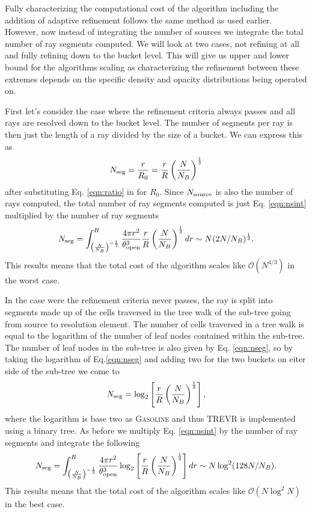 \documentclass[fleq,usenatbib]{mnras}
\newcommand{\acro}{TREVR}
\newcommand{\bigO}[1]{\mathcal{O}\left(#1\right)}
\newcommand{\NS}{N_{\rm source}}
\newcommand{\tO}{\theta_{\rm open}}
\begin{document}
Fully characterizing the computational cost of the algorithm including the 
addition of adaptive refinement follows the same method as used earlier. 
However, now instead of integrating the number of sources we integrate the 
total number of ray segments computed. We will look at two cases, not refining 
at all and fully refining down to the bucket level. This will give us upper 
and lower bound for the algorithms scaling as characterizing the refinement 
between these extremes depends on the specific density and opacity 
distributions being operated on.

First let's consider the case where the refinement criteria always passes and 
all rays are resolved down to the bucket level. The number of segments per ray 
is then just the length of a ray divided by the size of a bucket. We can 
express this as
\begin{equation}
\label{eqn:nseg}
N_{\rm seg} = \frac{r}{R_0} = \frac{r}{R}\left(\frac{N}{N_B}\right)^\frac{1}{3}
\end{equation}
after substituting Eq. \ref{eqn:ratio} in for $R_0$. Since $\NS$ is also the 
number of rays computed, the total number of ray segments computed is just Eq. 
\ref{eqn:nsint} multiplied by the number of ray segments
\begin{equation}
\label{eqn:nsegint}
N_{\rm seg} = \int_{\left(\frac{N}{N_B}\right)^{-\frac{1}{3}}}^R 
\frac{4\pi r^2}{\tO^3}
\frac{r}{R}\left(\frac{N}{N_B}\right)^\frac{1}{3} dr
\sim N(2N/N_B)^\frac{1}{3}.
\end{equation}
This results means that the total cost of the algorithm scales like 
$\bigO{N^{4/3}}$ in the worst case.

In the case were the refinement criteria never passes, the ray is split into 
segments made up of the cells traversed in the tree walk of the sub-tree going 
from source to resolution element. The number of cells traversed in a tree walk
is equal to the logarithm of the number of leaf nodes contained within the 
sub-tree. The number of leaf nodes in the sub-tree is also given by Eq. 
\ref{eqn:nseg}, so by taking the logarithm of Eq.\ref{eqn:nseg} and adding two 
for the two buckets on eiter side of the sub-tree we come to
\begin{equation}
\label{eqn:nseg2}
N_{\rm seg} = \log_2\left[\frac{r}{R}\left(
\frac{N}{N_B}\right)^\frac{1}{3}\right],
\end{equation}
where the logarithm is base two as \textsc{Gasoline} and thus \acro{} is 
implemented using a binary tree. As before we multiply Eq. \ref{eqn:nsint} 
by the number of ray segments and integrate the following
\begin{equation}
\label{eqn:nsegint2}
N_{\rm seg} = \int_{\left(\frac{N}{N_B}\right)^{-\frac{1}{3}}}^R 
\frac{4\pi r^2}{\tO^3}
\log_2\left[\frac{r}{R}\left(
\frac{N}{N_B}\right)^\frac{1}{3}\right] dr
\sim N\log^2(128 N/N_B).
\end{equation}
This results means that the total cost of the algorithm scales like 
$\bigO{N\log^2N}$ in the best case.
\end{document}
